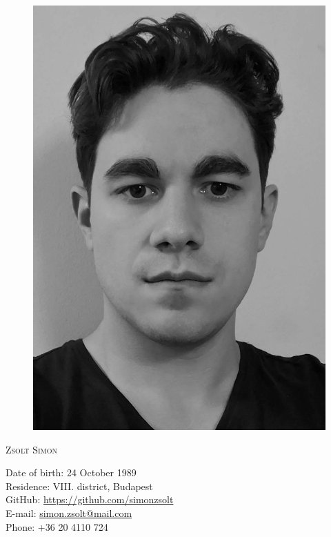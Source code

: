 

\setlength{\parindent}{0em}

\def \leftHeader{CV}
\def \rightHeader{Zsolt Simon}
\def \position{JavaScript Engineer}

\setmainfont[Mapping=tex-text,Numbers=OldStyle,Ligatures=TeX]{TeX Gyre Termes}



\begin{figure}
  \flushright
  \includegraphics[scale=0.4]{portrait_mono} 
\end{figure}

\begin{Large}
  \textsc{Zsolt Simon}
  \vspace{1em}
\end{Large}

Date of birth: 24 October 1989\\
Residence: VIII. district, Budapest\\ 
GitHub: \url{https://github.com/simonzsolt}\\
E-mail: \url{simon.zsolt@mail.com}\\
Phone: +36 20 4110 724

